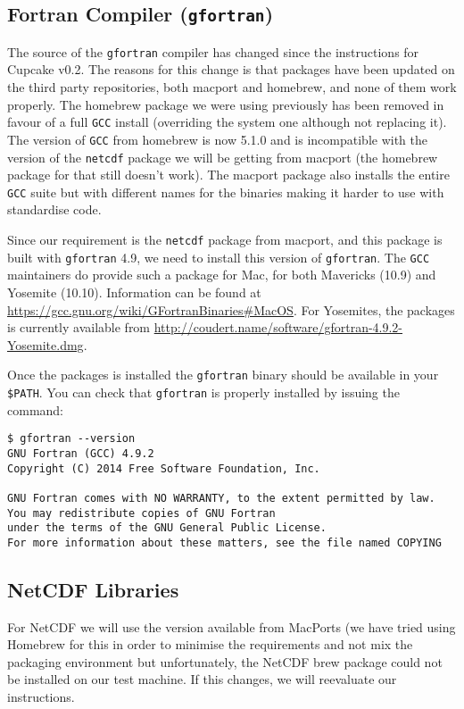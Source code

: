 \documentclass{scrartcl}
\begin{document}
\subsection{Fortran Compiler (\texttt{gfortran})}

The source of the \texttt{gfortran} compiler has changed since the instructions
for Cupcake v0.2. The reasons for this change is that packages have been
updated on the third party repositories, both macport and homebrew, and none of
them work properly. The homebrew package we were using previously has been
removed in favour of a full \texttt{GCC} install (overriding the system one
although not replacing it). The version of \texttt{GCC} from homebrew is now
5.1.0 and is incompatible with the version of the \texttt{netcdf} package we
will be getting from macport (the homebrew package for that still doesn't
work). The macport package also installs the entire \texttt{GCC} suite but with
different names for the binaries making it harder to use with standardise code.

Since our requirement is the \texttt{netcdf} package from macport, and this
package is built with \texttt{gfortran} 4.9, we need to install this version of
\texttt{gfortran}. The \texttt{GCC} maintainers do provide such a package for
Mac, for both Mavericks (10.9) and Yosemite (10.10). Information can be found
at \url{https://gcc.gnu.org/wiki/GFortranBinaries#MacOS}. For Yosemites, the
packages is currently available from
\url{http://coudert.name/software/gfortran-4.9.2-Yosemite.dmg}. 

Once the packages is installed the \texttt{gfortran} binary should be available
in your \verb|$PATH|. You can check that \texttt{gfortran} is properly
installed by issuing the command:

\begin{verbatim}
$ gfortran --version
GNU Fortran (GCC) 4.9.2
Copyright (C) 2014 Free Software Foundation, Inc.

GNU Fortran comes with NO WARRANTY, to the extent permitted by law.
You may redistribute copies of GNU Fortran
under the terms of the GNU General Public License.
For more information about these matters, see the file named COPYING
\end{verbatim} 

\subsection{NetCDF Libraries}

For NetCDF we will use the version available from MacPorts (we have tried using
Homebrew for this in order to minimise the requirements and not mix the
packaging environment but unfortunately, the NetCDF brew package could not be
installed on our test machine. If this changes, we will reevaluate our
instructions.
\end{document}
